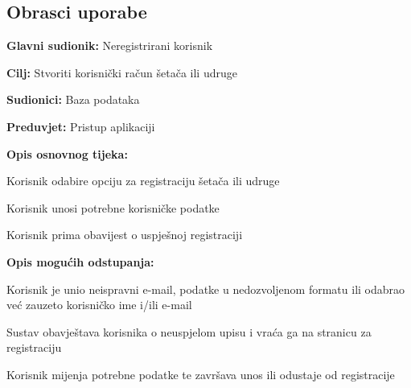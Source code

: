 			\eject 
			
			
				
			\subsection{Obrasci uporabe}
				

					\noindent {}
					\begin{packed_item}
	
						\item \textbf{Glavni sudionik: }Neregistrirani korisnik
						\item  \textbf{Cilj:} Stvoriti korisnički račun šetača ili udruge
						\item  \textbf{Sudionici:} Baza podataka
						\item  \textbf{Preduvjet:} Pristup aplikaciji
						\item  \textbf{Opis osnovnog tijeka:}
						
						\item[] \begin{packed_enum}
	
							\item Korisnik odabire opciju za registraciju šetača ili udruge
							\item Korisnik unosi potrebne korisničke podatke
							\item Korisnik prima obavijest o uspješnoj registraciji
	
						\end{packed_enum}
						
						\item  \textbf{Opis mogućih odstupanja:}
						
						\item[] \begin{packed_item}
	
							\item[2.a] Korisnik je unio neispravni e-mail, podatke u nedozvoljenom formatu ili odabrao već zauzeto korisničko ime i/ili e-mail
							\item[] \begin{packed_enum}
								\item Sustav obavještava korisnika o neuspjelom upisu i vraća ga na stranicu za registraciju
								\item Korisnik mijenja potrebne podatke te završava unos ili odustaje od registracije
							\end{packed_enum}
							
						\end{packed_item}
					\end{packed_item}
					
